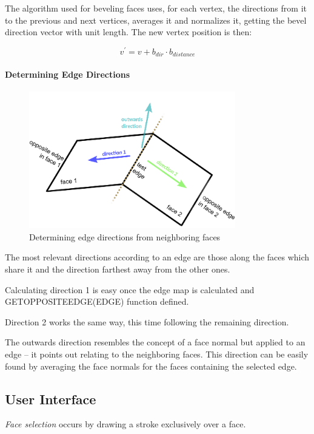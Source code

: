 The algorithm used for beveling faces uses, for each vertex,
the directions from it to the previous and next vertices,
averages it and normalizes it, getting the bevel direction vector with unit length.
The new vertex position is then:

\begin{equation}
	v^{'} = v + b_{dir} \cdot b_{distance}
\end{equation}


\paragraph{Determining Edge Directions}

\begin{figure}[!ht]
    \centering
    \includegraphics[width=9cm]{gfx/face-dirs.png}
    \caption{Determining edge directions from neighboring faces}
    \label{FIG-GS-FACE-DIRS}
\end{figure}

The most relevant directions according to an edge are those along the faces
which share it and the direction farthest away from the other ones.
 
Calculating direction 1 is easy once the edge map is calculated
and GETOPPOSITEEDGE(EDGE) function defined.

Direction 2 works the same way, this time following the remaining direction.

The outwards direction resembles the concept of a face normal but applied to an edge
-- it points out relating to the neighboring faces.
This direction can be easily found by averaging the face normals
for the faces containing the selected edge.


\subsection{User Interface}

\emph{Face selection} occurs by drawing a stroke exclusively over a face.

